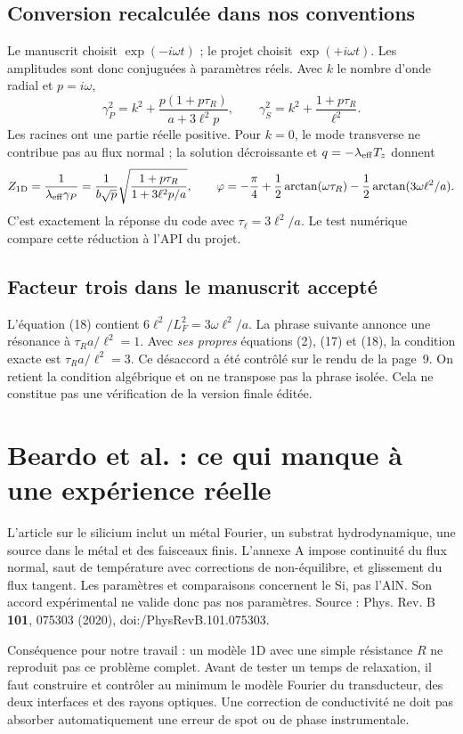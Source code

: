 \documentclass[11pt,a4paper]{article}
\begin{document}
\subsection{Conversion recalculée dans nos conventions}
Le manuscrit choisit $\exp(-i\omega t)$ ; le projet choisit $\exp(+i\omega t)$.
Les amplitudes sont donc conjuguées à paramètres réels.
Avec $k$ le nombre d'onde radial et $p=i\omega$,
\[
 \gamma_P^2=k^2+\frac{p(1+p\tau_R)}{a+3\ell^2p},
 \qquad
 \gamma_S^2=k^2+\frac{1+p\tau_R}{\ell^2}.
\]
Les racines ont une partie réelle positive.
Pour $k=0$, le mode transverse ne contribue pas au flux normal ;
la solution décroissante et $q=-\lambda_{\rm eff}T_z$ donnent
\[
 Z_{\rm 1D}=\frac1{\lambda_{\rm eff}\gamma_P}
 =\frac1{b\sqrt p}\sqrt{\frac{1+p\tau_R}{1+3\ell^2p/a}},
 \qquad
 \varphi=-\frac\pi4+\frac12\arctan(\omega\tau_R)
                  -\frac12\arctan(3\omega\ell^2/a).
\]
C'est exactement la réponse du code avec $\tau_\ell=3\ell^2/a$.
Le test numérique compare cette réduction à l'API du projet.

\subsection{Facteur trois dans le manuscrit accepté}
L'équation (18) contient $6\ell^2/L_F^2=3\omega\ell^2/a$.
La phrase suivante annonce une résonance à $\tau_R a/\ell^2=1$.
Avec \emph{ses propres} équations (2), (17) et (18), la condition exacte est
$\tau_R a/\ell^2=3$. Ce désaccord a été contrôlé sur le rendu de la page~9.
On retient la condition algébrique et on ne transpose pas la phrase isolée.
Cela ne constitue pas une vérification de la version finale éditée.

\section{Beardo et al. : ce qui manque à une expérience réelle}
L'article sur le silicium inclut un métal Fourier, un substrat hydrodynamique,
une source dans le métal et des faisceaux finis. L'annexe A impose continuité
du flux normal, saut de température avec corrections de non-équilibre, et
glissement du flux tangent. Les paramètres et comparaisons concernent le Si,
pas l'AlN. Son accord expérimental ne valide donc pas nos paramètres.
Source : Phys. Rev. B \textbf{101}, 075303 (2020),
doi:/\allowbreak PhysRevB.101.075303.

Conséquence pour notre travail : un modèle 1D avec une simple résistance $R$
ne reproduit pas ce problème complet. Avant de tester un temps de relaxation,
il faut construire et contrôler au minimum le modèle Fourier du transducteur,
des deux interfaces et des rayons optiques. Une correction de conductivité
ne doit pas absorber automatiquement une erreur de spot ou de phase instrumentale.
\end{document}
